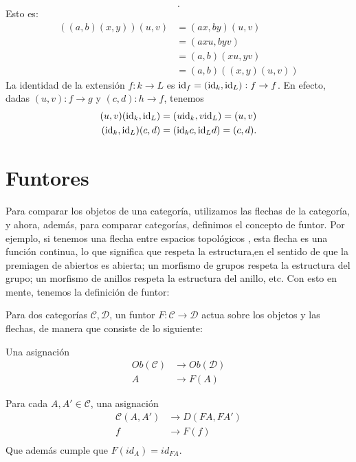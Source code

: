 \begin{example}
\begin{itemize}
\[    .\]
    Esto es:
    \begin{align*}
        ((a,b)(x,y))(u,v)
        &= (ax,by)(u,v) \\
        &= (axu,byv) \\
        &= (a,b)(xu,yv) \\
        &= (a,b)((x,y)(u,v))
    \end{align*}
    La identidad de la extensión $f:k\to L$ es
    $\mathrm{id}_f = (\mathrm{id}_k,\mathrm{id}_L):f\to f$.
    En efecto, dadas $(u,v):f\to g$ y $(c,d):h\to f$, tenemos
    \begin{align*}
        (u,v)(\mathrm{id}_k,\mathrm{id}_L) &= (u \mathrm{id}_k,v \mathrm{id}_L) = (u,v) \\
        (\mathrm{id}_k,\mathrm{id}_L)(c,d) &= (\mathrm{id}_k c,\mathrm{id}_L d) = (c,d).
    \end{align*}
\end{itemize}
\end{example}


\section{Funtores}
    Para comparar los objetos de una categoría, utilizamos las
    flechas de la categoría, y ahora, además, para comparar
    categorías, definimos el concepto de funtor.
    Por ejemplo, si tenemos una flecha entre espacios topológicos
    , esta flecha es una función continua, lo que significa que
    respeta la estructura,en el sentido de que la premiagen de
    abiertos es abierta; un morfismo de grupos respeta la
    estructura del grupo; un morfismo de anillos respeta la
    estructura del anillo, etc.
    Con esto en mente, tenemos la definición de funtor:
    \begin{definition}[Funtor]
        Para dos categorías $\mathcal{C,D}$, un funtor $F:\mathcal{C\to D}$ actua sobre los objetos y las flechas, de manera que consiste de lo siguiente:
        \item Una asignación 
            \begin{align*}
                Ob(\mathcal{C}) & \longrightarrow Ob(\mathcal{D}) \\
                A & \to F(A)
            \end{align*}
        \item Para cada $A,A'\in \mathcal{C}$, una asignación
            \begin{align*}
                \mathcal{C}(A,A') & \longrightarrow D(FA,FA') \\
                f & \to F(f) \\
            \end{align*}
        Que además cumple que $F(id_A)=id_{FA}$. 
    \end{definition}
    
